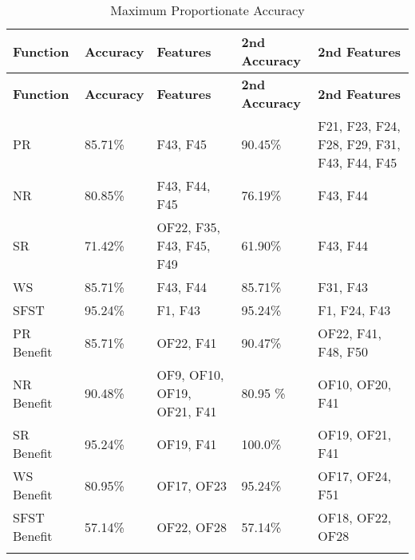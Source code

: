\begin{longtable}{|p{3cm}|p{3cm}|p{2cm}|p{2cm}|p{2cm}|}
\hline
\textbf{Function} & \textbf{Accuracy} &  \textbf{ Features} & \textbf{2nd Accuracy} &  \textbf{2nd Features}\\ \hline
\endfirsthead
\hline
\textbf{Function} & \textbf{Accuracy} &  \textbf{ Features} & \textbf{2nd Accuracy} &  \textbf{2nd Features}\\ \hline
\endhead

PR & 85.71\% & F43, F45 & 90.45\% &  F21, F23, F24, F28, F29, F31, F43, F44, F45 \\ \hline
NR & 80.85\% & F43, F44, F45 & 76.19\% &  F43, F44 \\ \hline
SR & 71.42\% & OF22, F35, F43, F45, F49 & 61.90\% & F43, F44 \\ \hline
WS & 85.71\% & F43, F44 & 85.71\% & F31, F43 \\ \hline
SFST & 95.24\% & F1, F43 & 95.24\% & F1, F24, F43 \\ \hline
PR Benefit & 85.71\% & OF22, F41 & 90.47\% & OF22, F41, F48, F50 \\ \hline
NR Benefit & 90.48\% & OF9, OF10, OF19, OF21, F41 & 80.95 \% & OF10, OF20, F41 \\ \hline
SR Benefit & 95.24\% & OF19, F41 & 100.0\% & OF19, OF21, F41\\ \hline
WS Benefit & 80.95\% & OF17, OF23 & 95.24\% & OF17, OF24, F51\\ \hline
SFST Benefit & 57.14\% & OF22, OF28 & 57.14\% & OF18, OF22, OF28 \\ \hline
\caption{Maximum Proportionate Accuracy}
\label{tab_class_spec:featred_small}
\end{longtable}
